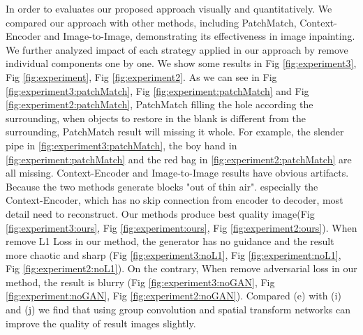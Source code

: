 \documentclass{IEEE_lsens}
\begin{document}
In order to evaluates our proposed approach visually and quantitatively. We compared our approach with other methods, including PatchMatch, Context-Encoder and Image-to-Image, demonstrating its effectiveness in image inpainting. We further analyzed impact of each strategy applied in our approach by remove individual components one by one. We show some results in Fig \ref{fig:experiment3}, Fig \ref{fig:experiment}, Fig \ref{fig:experiment2}. As we can see in Fig \ref{fig:experiment3:patchMatch}, Fig \ref{fig:experiment:patchMatch} and Fig \ref{fig:experiment2:patchMatch}, PatchMatch filling the hole according the surrounding, when objects to restore in the blank is different from the surrounding, PatchMatch result will missing it whole. For example, the slender pipe in \ref{fig:experiment3:patchMatch}, the boy hand in \ref{fig:experiment:patchMatch} and the red bag in \ref{fig:experiment2:patchMatch} are all missing. Context-Encoder and Image-to-Image results have obvious artifacts. Because the two methods generate blocks "out of thin air". especially the Context-Encoder, which has no skip connection from encoder to decoder, most detail need to reconstruct. Our methods produce best quality image(Fig \ref{fig:experiment3:ours}, Fig \ref{fig:experiment:ours}, Fig \ref{fig:experiment2:ours}). When remove L1 Loss in our method, the generator has no guidance and the result more chaotic and sharp (Fig \ref{fig:experiment3:noL1}, Fig \ref{fig:experiment:noL1}, Fig \ref{fig:experiment2:noL1}). On the contrary, When remove adversarial loss in our method, the result is blurry (Fig \ref{fig:experiment3:noGAN}, Fig \ref{fig:experiment:noGAN}, Fig \ref{fig:experiment2:noGAN}). Compared (e) with (i) and (j) we find that using group convolution and spatial transform networks can improve the quality of result images slightly. 
\end{document}

